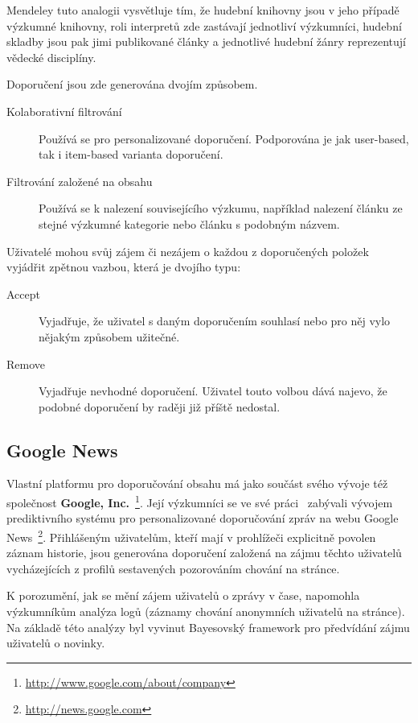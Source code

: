 \documentclass[thesis=M,czech]{FITthesis}[2014/05/07]
\begin{document}
Mendeley tuto analogii vysvětluje tím, že hudební knihovny jsou v jeho případě výzkumné knihovny, roli interpretů zde zastávají jednotliví výzkumníci, hudební skladby jsou pak jimi publikované články a jednotlivé hudební žánry reprezentují vědecké disciplíny.  

Doporučení jsou zde generována dvojím způsobem. 

\begin{description}
	\item[Kolaborativní filtrování] Používá se pro personalizované doporučení. Podporována je jak user-based, tak i item-based varianta doporučení.
	\item[Filtrování založené na obsahu] Používá se k nalezení souvisejícího výzkumu, například nalezení článku ze stejné výzkumné kategorie nebo článku s podobným názvem. 
\end{description}

Uživatelé mohou svůj zájem či nezájem o každou z doporučených položek vyjádřit zpětnou vazbou, která je dvojího typu:

\begin{description}
	\item[Accept] Vyjadřuje, že uživatel s daným doporučením souhlasí nebo pro něj vylo nějakým způsobem užitečné.
	\item[Remove] Vyjadřuje nevhodné doporučení. Uživatel touto volbou dává najevo, že podobné doporučení by raději již příště nedostal.
\end{description}

\subsection{Google News}	

Vlastní platformu pro doporučování obsahu má jako součást svého vývoje též společnost \textbf{Google, Inc.}~\footnote{\url{http://www.google.com/about/company}}. Její výzkumníci se ve své práci~\cite{googlenews} zabývali vývojem prediktivního systému pro personalizované doporučování zpráv na webu Google News~\footnote{\url{http://news.google.com}}. Přihlášeným uživatelům, kteří mají v prohlížeči explicitně povolen záznam historie, jsou generována doporučení založená na zájmu těchto uživatelů vycházejících z profilů sestavených pozorováním chování na stránce.  

K porozumění, jak se mění zájem uživatelů o zprávy v čase, napomohla výzkumníkům analýza logů (záznamy chování anonymních uživatelů na stránce). Na základě této analýzy byl vyvinut Bayesovský framework pro předvídání zájmu uživatelů o novinky.
\end{document}
